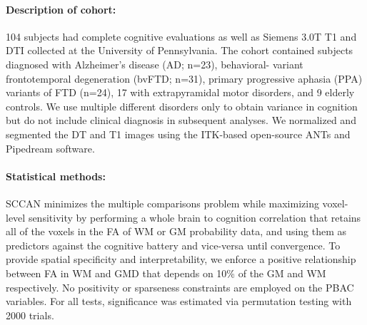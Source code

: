 \documentclass[paperwidth=48in,paperheight=48in,portrait,final]{tex/baposter}
\begin{document}
\begin{poster}
{\paragraph{Description of cohort: }
104 subjects had complete cognitive evaluations as well as Siemens
3.0T T1 and DTI collected at the University of Pennsylvania. The
cohort contained subjects diagnosed with Alzheimer's disease (AD;
n=23), behavioral- variant frontotemporal degeneration (bvFTD; n=31),
primary progressive aphasia (PPA) variants of FTD (n=24), 17 with
extrapyramidal motor disorders, and 9 elderly controls. We use
multiple different disorders only to obtain variance in cognition but
do not include clinical diagnosis in subsequent analyses. We
normalized and segmented \cite{Avants2011a} the DT and T1 images using
the ITK-based open-source ANTs \cite{Avants2011} and Pipedream software.
\newline
\paragraph{Statistical methods:} SCCAN minimizes the multiple comparisons problem while
maximizing voxel-level sensitivity by performing a whole brain to
cognition correlation that retains all of the voxels in the FA of WM
or GM probability data, and using them as predictors against the
cognitive battery and vice-versa until convergence. To provide spatial
specificity and interpretability, we enforce a positive relationship
between FA in WM and GMD that depends on 10\% of the GM and WM
respectively. No positivity or sparseness constraints are employed on
the PBAC variables. For all tests, significance was estimated via
permutation testing with 2000 trials. \cite{Avants2010b}
     \vspace{0.3em}
  }

\end{poster}
\end{document}
